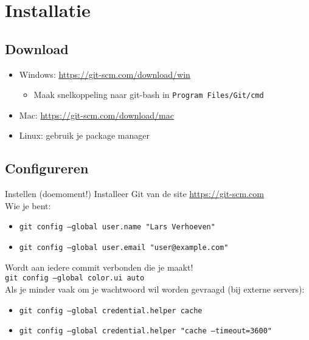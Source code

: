 \section[Get git]{Installatie}

\subsection{Download}
\begin{frame}
	\begin{itemize}
		\item Windows: \url{https://git-scm.com/download/win}
			\begin{itemize}
				\item \small{Maak snelkoppeling naar git-bash in \tt{Program Files/Git/cmd}}
			\end{itemize}
		\item Mac: \url{https://git-scm.com/download/mac}
		\item Linux: gebruik je package manager
	\end{itemize}
\end{frame}

\subsection{Configureren}
\begin{frame}{Instellen (doemoment!)}
	Installeer Git van de site \url{https://git-scm.com}\\

	Wie je bent:
	\begin{itemize}
		\item \tt{git config --global user.name "Lars Verhoeven"}
		\item \tt{git config --global user.email "user@example.com"}
	\end{itemize}
	\alert{Wordt aan iedere commit verbonden die je maakt!}\\

	\texttt{git config --global color.ui auto}\\

	Als je minder vaak om je wachtwoord wil worden gevraagd (bij externe servers):

	\begin{itemize}
		\item \tt{git config --global credential.helper cache}
		\item \tt{git config --global credential.helper "cache --timeout=3600"}
	\end{itemize}
\end{frame}
